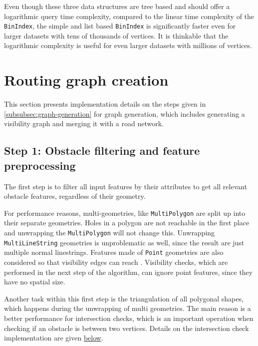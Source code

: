 		Even though these three data structures are tree based and should offer a logarithmic query time complexity, compared to the linear time complexity of the \texttt{BinIndex}, the simple and list based \texttt{BinIndex} is significantly faster even for larger datasets with tens of thousands of vertices.
		It is thinkable that the logarithmic complexity is useful for even larger datasets with millions of vertices.
		
		
\section{Routing graph creation}
\label{sec:visibility-graph-creation}
		
	This section presents implementation details on the steps given in \cref{subsubsec:graph-generation} for graph generation, which includes generating a visibility graph and merging it with a road network.

	\subsection{Step 1: Obstacle filtering and feature preprocessing}
	\label{subsec:step-1-preprocessing}
			
		The first step is to filter all input features by their attributes to get all relevant obstacle features, regardless of their geometry.
		
		For performance reasons, multi-geometries, like \texttt{MultiPolygon} are split up into their separate geometries.
		Holes in a polygon are not reachable in the first place and unwrapping the \texttt{MultiPolygon} will not change this.
		Unwrapping \texttt{MultiLineString} geometries is unproblematic as well, since the result are just multiple normal linestrings.
		Features made of \texttt{Point} geometries are also considered so that visibility edges can reach .
		Visibility checks, which are performed in the next step of the algorithm, can ignore point features, since they have no spatial size.
		
		Another task within this first step is the triangulation of all polygonal shapes, which happens during the unwrapping of multi geometries.
		The main reason is a better performance for intersection checks, which is an important operation when checking if an obstacle is between two vertices.
		Details on the intersection check implementation are given \hyperref[subsubsec:intersection-checks]{below}.
		
